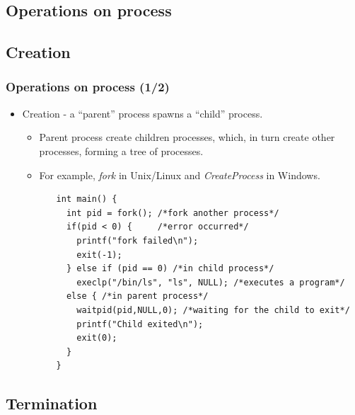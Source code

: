 \documentclass[CJKutf8,xcolor=pdftex,dvipsnames,table]{beamer}
\begin{document}
\begin{CJK*}{UTF8}{song}
  \section{Operations on process}

  \subsection{Creation}
  
  \begin{frame}[fragile]
  \frametitle{Operations on process (1/2)} \pause
  \begin{itemize}
  \item{Creation \pause - a ``parent'' process spawns a ``child'' process.} \pause
    \begin{itemize}
    \item{Parent process create children processes, which, in turn create other processes, forming a tree of processes.} \pause
    \item{For example, \emph{fork} in Unix/Linux and \emph{CreateProcess} in Windows.} \pause
    \end{itemize}
  \end{itemize}
\begin{lstlisting}
          int main() {
            int pid = fork(); /*fork another process*/
            if(pid < 0) {     /*error occurred*/
              printf("fork failed\n");
              exit(-1);
            } else if (pid == 0) /*in child process*/
              execlp("/bin/ls", "ls", NULL); /*executes a program*/
            else { /*in parent process*/
              waitpid(pid,NULL,0); /*waiting for the child to exit*/
              printf("Child exited\n");
              exit(0);
            }
          }
\end{lstlisting}
\end{frame}

  \subsection{Termination}


\end{CJK*}
\end{document}

